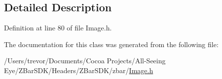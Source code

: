 \subsection{Detailed Description}


Definition at line 80 of file Image.h.



The documentation for this class was generated from the following file:\begin{DoxyCompactItemize}
\item 
/Users/trevor/Documents/Cocoa Projects/All-\/Seeing Eye/ZBarSDK/Headers/ZBarSDK/zbar/\hyperlink{_image_8h}{Image.h}\end{DoxyCompactItemize}
